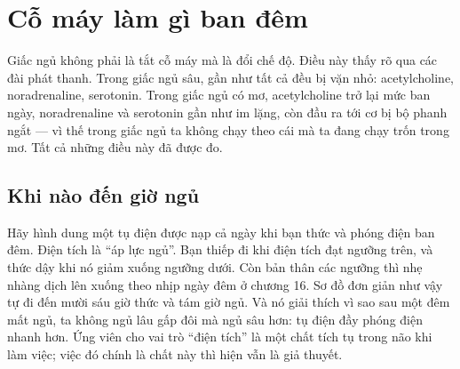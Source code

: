 \chapter{Cỗ máy làm gì ban đêm}

Giấc ngủ không phải là tắt cỗ máy mà là đổi chế độ. Điều này thấy rõ qua các đài phát thanh. Trong giấc ngủ sâu, gần như tất cả đều bị vặn nhỏ: acetylcholine, noradrenaline, serotonin. Trong giấc ngủ có mơ, acetylcholine trở lại mức ban ngày, noradrenaline và serotonin gần như im lặng, còn đầu ra tới cơ bị bộ phanh ngắt --- vì thế trong giấc ngủ ta không chạy theo cái mà ta đang chạy trốn trong mơ. Tất cả những điều này đã được đo.

\section*{Khi nào đến giờ ngủ}

Hãy hình dung một tụ điện được nạp cả ngày khi bạn thức và phóng điện ban đêm. Điện tích là ``áp lực ngủ''. Bạn thiếp đi khi điện tích đạt ngưỡng trên, và thức dậy khi nó giảm xuống ngưỡng dưới. Còn bản thân các ngưỡng thì nhẹ nhàng dịch lên xuống theo nhịp ngày đêm ở chương 16. Sơ đồ đơn giản như vậy tự đi đến mười sáu giờ thức và tám giờ ngủ. Và nó giải thích vì sao sau một đêm mất ngủ, ta không ngủ lâu gấp đôi mà ngủ sâu hơn: tụ điện đầy phóng điện nhanh hơn. Ứng viên cho vai trò ``điện tích'' là một chất tích tụ trong não khi làm việc; việc đó chính là chất này thì hiện vẫn là giả thuyết.


